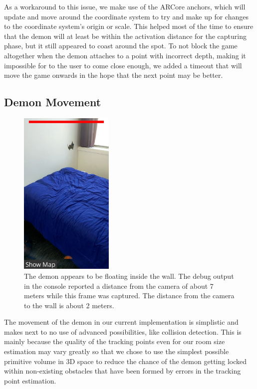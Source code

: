 As a workaround to this issue, we make use of the ARCore anchors, which will update and move around the coordinate system to try and make up for changes to the coordinate system's origin or scale.
This helped most of the time to ensure that the demon will at least be within the activation distance for the capturing phase, but it still appeared to coast around the spot.
To not block the game altogether when the demon attaches to a point with incorrect depth, making it impossible for to the user to come close enough, we added a timeout that will move the game onwards in the hope that the next point may be better.

\subsection{Demon Movement}

\begin{figure}
    \includegraphics[height=8cm]{graphics/demon-wrong-depth.jpg}
    \caption{The demon appears to be floating inside the wall. The debug output in the console reported a distance from the camera of about 7 meters while this frame was captured. The distance from the camera to the wall is about 2 meters.}
    \label{fig:demon_wrong_depth}
\end{figure}

The movement of the demon in our current implementation is simplistic and makes next to no use of advanced possibilities, like collision detection.
This is mainly because the quality of the tracking points even for our room size estimation may vary greatly so that we chose to use the simplest possible primitive volume in 3D space to reduce the chance of the demon getting locked within non-existing obstacles that have been formed by errors in the tracking point estimation.

